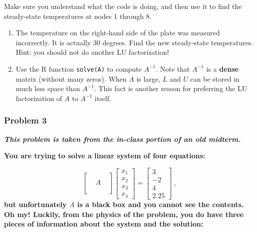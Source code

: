 \documentclass[]{article}
\begin{document}
Make sure you understand what the code is doing, and then use it to find
the steady-state temperatures at nodes 1 through 8.

\begin{enumerate}
\def\labelenumi{\alph{enumi})}
\setcounter{enumi}{3}
\item
  The temperature on the right-hand side of the plate was measured
  incorrectly. It is actually 30 degrees. Find the new steady-state
  temperatures. Hint: you should not do another LU factorization!
\item
  Use the R function \texttt{solve(A)} to compute \(A^{-1}\). Note that
  \(A^{-1}\) is a \textbf{dense} matrix (without many zeros). When \(A\)
  is large, \(L\) and \(U\) can be stored in much less space than
  \(A^{-1}\). This fact is another reason for preferring the LU
  factorization of \(A\) to \(A^{-1}\) itself.
\end{enumerate}

\hypertarget{problem-3}{%
\subsubsection{Problem 3}\label{problem-3}}

\textbf{\emph{This problem is taken from the in-class portion of an old
midterm.}}

\textbf{You are trying to solve a linear system of four equations:}

\textbf{\[\left[\begin{array}{ccc} && \\ & A &   \\ && \\ && \end{array}\right]
\left[\begin{array}{c}x_1 \\ x_2 \\ x_3 \\ x_4 \end{array}\right]=\left[\begin{array}{c}3 \\ -2 \\ 4 \\ 2.25 \end{array}\right]~,\]}
\textbf{but unfortunately \(A\) is a black box and you cannot see the
contents. Oh my! Luckily, from the physics of the problem, you do have
three pieces of information about the system and the solution:}
\end{document}
